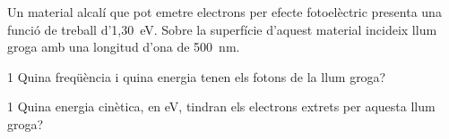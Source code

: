 Un material alcalí que pot emetre electrons per efecte fotoelèctric presenta una funció de treball d'1,30~eV. Sobre la superfície d'aquest material incideix llum groga amb una longitud d'ona de 500~nm.

\begin{apartat}{1}
Quina freqüència i quina energia tenen els fotons de la llum groga?
\end{apartat}

\begin{apartat}{1}
Quina energia cinètica, en eV, tindran els electrons extrets per aquesta llum groga?
\end{apartat}

